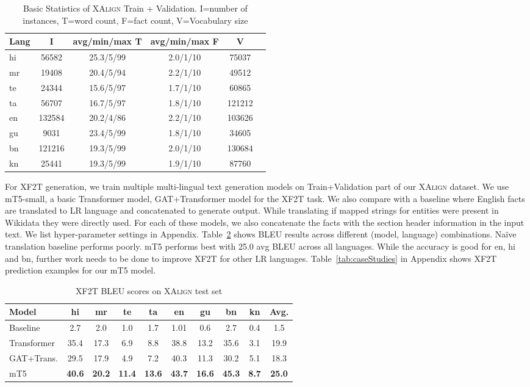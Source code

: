 \documentclass[11pt]{article}
\begin{document}
\begin{table}[!h]
    \centering
    \scriptsize
    \begin{tabular}{|l|c|c|c|c|c|}
    \hline
Lang &I&avg/min/max T&avg/min/max F&V\\
    \hline
    \hline
    hi&56582&25.3/5/99&2.0/1/10&75037\\
    \hline
    mr&19408&20.4/5/94&2.2/1/10&49512\\
    \hline
    te&24344&15.6/5/97&1.7/1/10&60865\\
    \hline
    ta&56707&16.7/5/97&1.8/1/10&121212\\
    \hline
    en&132584&20.2/4/86&2.2/1/10&103626\\
    \hline
    gu&9031&23.4/5/99&1.8/1/10&34605\\
    \hline
    bn&121216&19.3/5/99&2.0/1/10&130684\\
    \hline
    kn&25441&19.3/5/99&1.9/1/10&87760\\
    \hline
    \end{tabular}
    \caption{Basic Statistics of \textsc{XAlign} Train + Validation. I=number of instances, T=word count, F=fact count, V=Vocabulary size}
    \label{tab:xalignDataStats}
\end{table}

For XF2T generation, we train multiple  multi-lingual text generation models on Train+Validation part of our \textsc{XAlign} dataset. We use mT5-small, a basic Transformer model, GAT+Transformer model for the XF2T task. We also compare with a baseline where English facts are translated to LR language and concatenated to generate output. While translating if mapped strings for entities were present in Wikidata they were directly used. For each of these models, we also concatenate the facts with the section header information in the input text. We list hyper-parameter settings in Appendix. Table~\ref{tab:finalResults} shows BLEU results across different (model, language) combinations. Na\"ive translation baseline performs poorly. mT5 performs best with 25.0 avg BLEU across all languages. While the accuracy is good for en, hi and bn, further work needs to be done to improve XF2T for other LR languages. Table~\ref{tab:caseStudies} in Appendix shows XF2T prediction examples for our mT5 model.

\setlength{\tabcolsep}{3pt}
\begin{table}
    \centering
    \scriptsize
    \begin{tabular}{|l|c|c|c|c|c|c|c|c||c|}
\hline
Model&hi&mr&te&ta&en&gu&bn&kn&Avg.\\
\hline
\hline
Baseline&2.7&2.0&1.0&1.7&1.01&0.6&2.7&0.4&1.5\\
\hline
Transformer&35.4&17.3&6.9&8.8&38.8&13.2&35.6&3.1&19.9\\
\hline
GAT+Trans.&29.5&17.9&4.9&7.2&40.3&11.3&30.2&5.1&18.3\\
\hline
mT5&\textbf{40.6}&\textbf{20.2}&\textbf{11.4}&\textbf{13.6}&\textbf{43.7}&\textbf{16.6}&\textbf{45.3}&\textbf{8.7}&\textbf{25.0}\\
\hline
    \end{tabular}
    \caption{XF2T BLEU scores on \textsc{XAlign} test set}
    \label{tab:finalResults}
\end{table}
\end{document}
